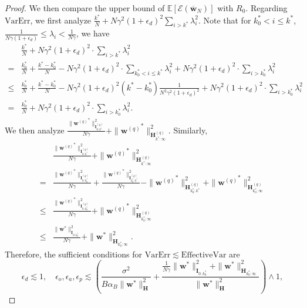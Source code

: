 \documentclass[11pt, letterpaper]{article}
\begin{document}
\begin{proof}
    We then compare the upper bound of $\mathbb{E}[\mathcal{E}(\overline{\mathbf{w}}_N)]$ with $R_0$. Regarding $\mathrm{VarErr}$, we first analyze $\frac{k^*}{N}+N\gamma^2(1+\epsilon_d)^2\sum_{i>k^*}\lambda_i^2$. Note that for $k_0^*< i \leq k^*$, $\frac{1}{N\gamma(1+\epsilon_d)}\leq\lambda_i<\frac{1}{N\gamma}$, we have
    \begin{equation*}
        \begin{aligned}
            &\frac{k^*}{N}+N\gamma^2(1+\epsilon_d)^2\cdot\sum_{i>k^*}\lambda_i^2\\
            =&\frac{k_0^*}{N}+\frac{k^*-k_0^*}{N}-N\gamma^2(1+\epsilon_d)^2\cdot\sum_{k_0^*<i\leq k^*}\lambda_i^2+N\gamma^2(1+\epsilon_d)^2\cdot\sum_{i>k_0^*}\lambda_i^2\\
            \leq &\frac{k_0^*}{N}+\frac{k^*-k_0^*}{N}-N\gamma^2(1+\epsilon_d)^2(k^*-k_0^*)\frac{1}{N^2\gamma^2(1+\epsilon_d)^2}+N\gamma^2(1+\epsilon_d)^2\cdot\sum_{i>k_0^*}\lambda_i^2\\
            =&\frac{k_0^*}{N}+N\gamma^2(1+\epsilon_d)^2\cdot\sum_{i>k_0^*}\lambda_i^2.
        \end{aligned}
    \end{equation*}
    We then analyze $\frac{\|{\mathbf{w}^{(q)}}^*\|_{\mathbf{I}_{0:k^*}^{(q)}}^2}{N\gamma}+\|{\mathbf{w}^{(q)}}^*\|_{\mathbf{H}_{k^*:\infty}^{(q)}}^2$. Similarly,
    \begin{equation*}
        \begin{aligned}
            &\frac{\|{\mathbf{w}^{(q)}}^*\|_{\mathbf{I}_{0:k^*}^{(q)}}^2}{N\gamma}+\|{\mathbf{w}^{(q)}}^*\|_{\mathbf{H}_{k^*:\infty}^{(q)}}^2\\
            =&\frac{\|{\mathbf{w}^{(q)}}^*\|_{\mathbf{I}_{0:k_0^*}^{(q)}}^2}{N\gamma}+\frac{\|{\mathbf{w}^{(q)}}^*\|_{\mathbf{I}_{k_0^*:k^*}^{(q)}}^2}{N\gamma}-\|{\mathbf{w}^{(q)}}^*\|_{\mathbf{H}_{k_0^*:k^*}^{(q)}}^2+\|{\mathbf{w}^{(q)}}^*\|_{\mathbf{H}_{k_0^*:\infty}^{(q)}}^2\\
            \leq &\frac{\|{\mathbf{w}^{(q)}}^*\|_{\mathbf{I}_{0:k_0^*}^{(q)}}^2}{N\gamma}+\|{\mathbf{w}^{(q)}}^*\|_{\mathbf{H}_{k_0^*:\infty}^{(q)}}^2\\
            \leq &\frac{\|{\mathbf{w}}^*\|_{\mathbf{I}_{0:k_0^*}}^2}{N\gamma}+\|{\mathbf{w}}^*\|_{\mathbf{H}_{k_0^*:\infty}}^2.
        \end{aligned}
    \end{equation*}
    Therefore, the sufficient conditions for $\mathrm{VarErr}\lesssim \mathrm{EffectiveVar}$ are
    \begin{equation*}
        \epsilon_d\lesssim 1,\quad  \epsilon_o,\epsilon_a,\epsilon_p \lesssim  \left(\frac{\sigma^2}{B\alpha_B\|\mathbf{w}^*\|_\mathbf{H}^2}+\frac{\frac{1}{N\gamma}\|{\mathbf{w}}^*\|_{\mathbf{I}_{0:k_0^*}}^2+\|{\mathbf{w}}^*\|_{\mathbf{H}_{k_0^*:\infty}}^2}{\|\mathbf{w}^*\|_\mathbf{H}^2}\right)\wedge 1,
    \end{equation*}
    

\end{proof}
\end{document}
